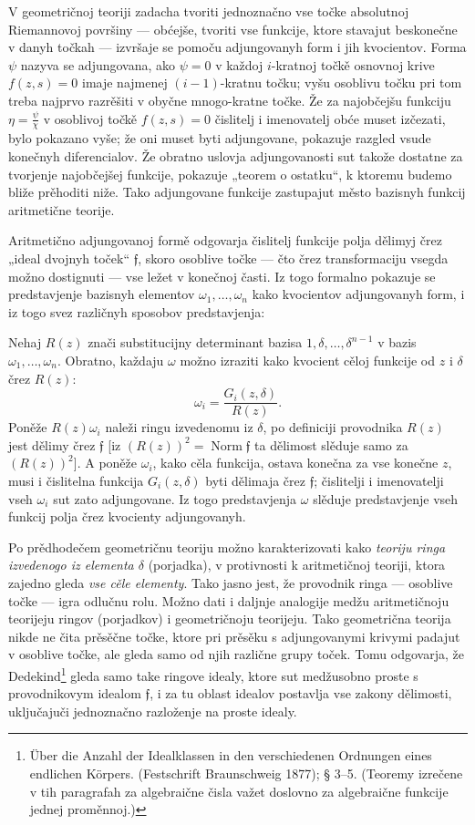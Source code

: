 \documentclass[11pt]{article}
\providecommand{\frf}{\mathfrak f}
\begin{document}
V geometričnoj teoriji zadacha tvoriti jednoznačno vse točke absolutnoj Riemannovoj površiny --- obćejše, tvoriti vse funkcije, ktore stavajut beskonečne v danyh točkah --- izvršaje se pomoču adjungovanyh form i jih kvocientov. Forma \(\psi\) nazyva se adjungovana, ako \(\psi=0\) v každoj \(i\)-kratnoj točkě osnovnoj krive \(f(z,s)=0\) imaje najmenej \((i-1)\)-kratnu točku; vyšu osoblivu točku pri tom treba najprvo razrěšiti v obyčne mnogo-kratne točke. Že za najobčejšu funkciju \(\eta=\frac{\psi}{\chi}\) v osoblivoj točkě \(f(z,s)=0\) čislitelj i imenovatelj obće muset izčezati, bylo pokazano vyše; že oni muset byti adjungovane, pokazuje razgled vsude konečnyh diferencialov. Že obratno uslovja adjungovanosti sut takože dostatne za tvorjenje najobčejšej funkcije, pokazuje „teorem o ostatku“, k ktoremu budemo bliže prěhoditi niže. Tako adjungovane funkcije zastupajut město bazisnyh funkcij aritmetične teorije.

Aritmetično adjungovanoj formě odgovarja čislitelj funkcije polja dělimyj črez „ideal dvojnyh toček“ \(\frf\), skoro osoblive točke --- čto črez transformaciju vsegda možno dostignuti --- vse ležet v konečnoj časti. Iz togo formalno pokazuje se predstavjenje bazisnyh elementov \(\omega_1,\ldots,\omega_n\) kako kvocientov adjungovanyh form, i iz togo svez različnyh sposobov predstavjenja:

Nehaj \(R(z)\) znači substitucijny determinant bazisa \(1,\delta,\ldots,\delta^{n-1}\) v bazis \(\omega_1,\ldots,\omega_n\). Obratno, každaju \(\omega\) možno izraziti kako kvocient cěloj funkcije od \(z\) i \(\delta\) črez \(R(z)\):
\[
\omega_i=\frac{G_i(z,\delta)}{R(z)}.
\]
Poněže \(R(z)\omega_i\) naleži ringu izvedenomu iz \(\delta\), po definiciji provodnika \(R(z)\) jest dělimy črez \(\frf\) [iz \((R(z))^2=\operatorname{Norm}\frf\) ta dělimost slěduje samo za \((R(z))^2\)]. A poněže \(\omega_i\), kako cěla funkcija, ostava konečna za vse konečne \(z\), musi i čislitelna funkcija \(G_i(z,\delta)\) byti dělimaja črez \(\frf\); čislitelji i imenovatelji vseh \(\omega_i\) sut zato adjungovane. Iz togo predstavjenja \(\omega\) slěduje predstavjenje vseh funkcij polja črez kvocienty adjungovanyh.

Po prědhodečem geometričnu teoriju možno karakterizovati kako {\itshape teoriju ringa izvedenogo iz elementa \(\delta\)} (porjadka), v protivnosti k aritmetičnoj teoriji, ktora zajedno gleda {\itshape vse cěle elementy}. Tako jasno jest, že provodnik ringa --- osoblive točke --- igra odlučnu rolu. Možno dati i daljnje analogije medžu aritmetičnoju teorijeju ringov (porjadkov) i geometričnoju teorijeju. Tako geometrična teorija nikde ne čita prěsěčne točke, ktore pri prěsěku s adjungovanymi krivymi padajut v osoblive točke, ale gleda samo od njih različne grupy toček. Tomu odgovarja, že Dedekind\footnote{Über die Anzahl der Idealklassen in den verschiedenen Ordnungen eines endlichen Körpers. (Festschrift Braunschweig 1877); § 3--5. (Teoremy izrečene v tih paragrafah za algebraične čisla važet doslovno za algebraične funkcije jednej proměnnoj.)} gleda samo take ringove idealy, ktore sut medžusobno proste s provodnikovym idealom \(\frf\), i za tu oblast idealov postavlja vse zakony dělimosti, uključajuči jednoznačno razloženje na proste idealy.
\end{document}

